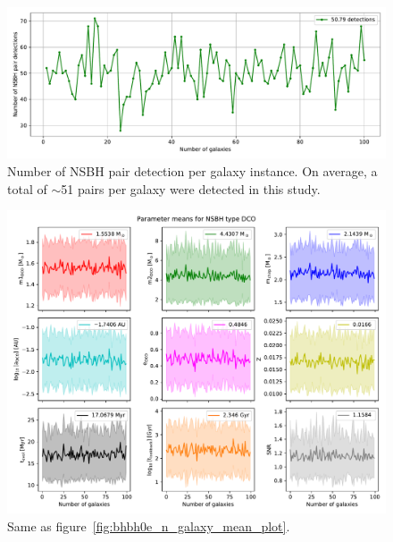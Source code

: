 \begin{figure}[!h]
    \centering
    \includegraphics[width=\columnwidth]{analysis_data/004__images_for_latex/NSBH0e_n_detections}
    \caption{Number of NSBH pair detection per galaxy instance. On average, a total of $\sim$51 pairs per galaxy were detected in this study.}
    \label{fig:nsbh0endetections}
\end{figure}

\begin{figure}[!h]
    \centering
    \includegraphics[width=\columnwidth]{analysis_data/004__images_for_latex/NSBH0e_n_galaxy_mean_plot}
    \caption{Same as figure~\ref{fig:bhbh0e_n_galaxy_mean_plot}.}
    \label{fig:nsbh0e_n_galaxy_mean_plot}
\end{figure}

\newpage

